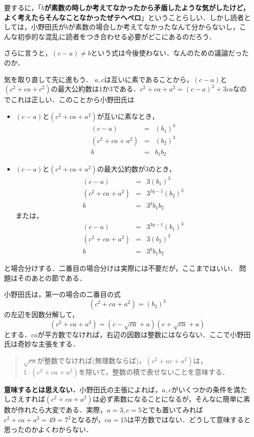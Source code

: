 要するに，「\textbf{$b$が素数の時しか考えてなかったから矛盾したような気がしたけど，よく考えたらそんなことなかったぜテヘペロ}」ということらしい．しかし読者としては，小野田氏が$b$が素数の場合しか考えてなかったなんて分からないし，こんな初歩的な混乱に読者をつき合わせる必要がどこにあるのだろう．

さらに言うと，$(c-a)\neq b$という式は今後使わない．なんのための議論だったのか．



気を取り直して先に進もう．
$a,c$は互いに素であることから，$(c-a)$と$(c^2+ca+c^2)$の最大公約数は1か3である．$c^2+ca+a^2=(c-a)^2+3ca$なのでこれは正しい．このことから小野田氏は

\begin{itemize}
\item $(c-a)$と$(c^2+ca+a^2)$が互いに素なとき，
\begin{eqnarray*}
(c-a)&=&(b_1)^3\\
(c^2+ca+a^2)&=&(b_2)^3\\
b&=&b_1b_2
\end{eqnarray*}

\item $(c-a)$と$(c^2+ca+a^2)$の最大公約数が3のとき，
\begin{eqnarray*}
(c-a)&=&3(b_1)^3\\
(c^2+ca+a^2)&=&3^{3q-1}(b_2)^3\\
b&=&3^qb_1b_2
\end{eqnarray*}
または，
\begin{eqnarray*}
(c-a)&=&3^{3q-1}(b_1)^3\\
(c^2+ca+a^2)&=&3(b_2)^3\\
b&=&3^qb_1b_2
\end{eqnarray*}
\end{itemize}

と場合分けする．二番目の場合分けは実際には不要だが，ここまではいい．
問題はそのあとの節である．

小野田氏は，第一の場合の二番目の式
\[(c^2+ca+a^2)=(b_2)^3\]
の左辺を因数分解して，
\[(c^2+ca+a^2)=(c-\sqrt{ca}+a)(c+\sqrt{ca}+a)\]
とする．$ca$が平方数でなければ，右辺の因数は整数にはならない．ここで小野田氏は奇妙な主張をする．

\begin{quote}
$\sqrt{ca}$が整数でなければ(無理数ならば)，$(c^2+ac+a^2)$は，$1\cdot (c^2+ca+a^2)$を除いて，整数の積で表せないことを意味する．
\end{quote}

\textbf{意味するとは思えない．}小野田氏の主張によれば，$a,c$がいくつかの条件を満たしさえすれば$(c^2+ca+a^2)$は必ず素数になることになるが，そんなに簡単に素数が作れたら大変である．実際，$a=3,c=5$とでも置いてみれば$c^2+ca+a^2=49=7^2$となるが，$ca=15$は平方数ではない．どうして意味すると思ったのかよくわからない．

